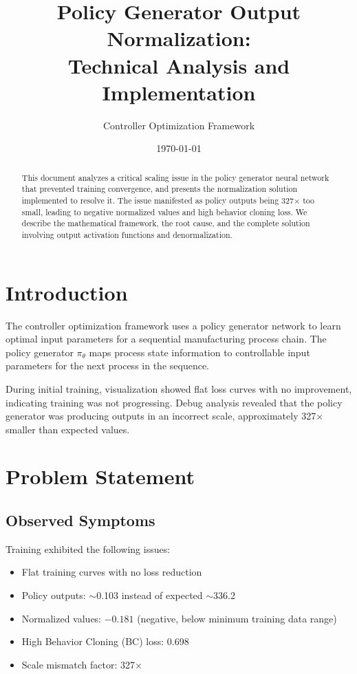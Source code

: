 \documentclass[11pt,a4paper]{article}
\title{Policy Generator Output Normalization:\\Technical Analysis and Implementation}
\author{Controller Optimization Framework}
\date{\today}
\begin{document}
\maketitle

\begin{abstract}
This document analyzes a critical scaling issue in the policy generator neural network that prevented training convergence, and presents the normalization solution implemented to resolve it. The issue manifested as policy outputs being 327$\times$ too small, leading to negative normalized values and high behavior cloning loss. We describe the mathematical framework, the root cause, and the complete solution involving output activation functions and denormalization.
\end{abstract}

\tableofcontents
\newpage

\section{Introduction}

The controller optimization framework uses a policy generator network to learn optimal input parameters for a sequential manufacturing process chain. The policy generator $\pi_\theta$ maps process state information to controllable input parameters for the next process in the sequence.

During initial training, visualization showed flat loss curves with no improvement, indicating training was not progressing. Debug analysis revealed that the policy generator was producing outputs in an incorrect scale, approximately 327$\times$ smaller than expected values.

\section{Problem Statement}

\subsection{Observed Symptoms}

Training exhibited the following issues:
\begin{itemize}
    \item Flat training curves with no loss reduction
    \item Policy outputs: $\sim$0.103 instead of expected $\sim$336.2
    \item Normalized values: $-0.181$ (negative, below minimum training data range)
    \item High Behavior Cloning (BC) loss: 0.698
    \item Scale mismatch factor: 327$\times$
\end{itemize}
\end{document}
